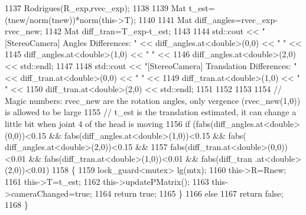 \begin{DoxyCode}
1137     Rodrigues(R\_exp,rvec\_exp);
1138 
1139     Mat t\_est=(tnew/norm(tnew))*norm(this->T);
1140 
1141     Mat diff\_angles=rvec\_exp-rvec\_new;
1142     Mat diff\_tran=T\_exp-t\_est;
1143 
1144     std::cout << \textcolor{stringliteral}{"[StereoCamera] Angles Differences: "} << diff\_angles.at<\textcolor{keywordtype}{double}>(0,0) << \textcolor{stringliteral}{" "} <<
1145                                                           diff\_angles.at<\textcolor{keywordtype}{double}>(1,0) << \textcolor{stringliteral}{" "} <<
1146                                                           diff\_angles.at<\textcolor{keywordtype}{double}>(2,0) << std::endl;
1147 
1148     std::cout << \textcolor{stringliteral}{"[StereoCamera] Translation Differences: "} << diff\_tran.at<\textcolor{keywordtype}{double}>(0,0) << \textcolor{stringliteral}{" "} <<
1149                                                                diff\_tran.at<\textcolor{keywordtype}{double}>(1,0) << \textcolor{stringliteral}{" "} <<
1150                                                                diff\_tran.at<\textcolor{keywordtype}{double}>(2,0) << std::endl;
1151 
1152 
1153 
1154     \textcolor{comment}{// Magic numbers: rvec\_new are the rotation angles, only vergence (rvec\_new(1,0)) is allowed to be
       large}
1155     \textcolor{comment}{// t\_est is the translation estimated, it can change a little bit when joint 4 of the head is moving}
1156     \textcolor{keywordflow}{if} (fabs(diff\_angles.at<\textcolor{keywordtype}{double}>(0,0))<0.15 && fabs(diff\_angles.at<\textcolor{keywordtype}{double}>(1,0))<0.15 && fabs(
      diff\_angles.at<\textcolor{keywordtype}{double}>(2,0))<0.15 &&
1157             fabs(diff\_tran.at<\textcolor{keywordtype}{double}>(0,0))<0.01 && fabs(diff\_tran.at<\textcolor{keywordtype}{double}>(1,0))<0.01  && fabs(diff\_tran
      .at<\textcolor{keywordtype}{double}>(2,0))<0.01)
1158     \{
1159         lock\_guard<mutex> lg(mtx);
1160         this->R=Rnew;
1161         this->T=t\_est;
1162         this->updatePMatrix();
1163         this->cameraChanged=\textcolor{keyword}{true};
1164         \textcolor{keywordflow}{return} \textcolor{keyword}{true};
1165     \}
1166     \textcolor{keywordflow}{else}
1167         \textcolor{keywordflow}{return} \textcolor{keyword}{false};
1168 \}
\end{DoxyCode}
\mbox{\label{classStereoCamera_ab2eded08bca185ac22cd6343cb4c85c8}} 
